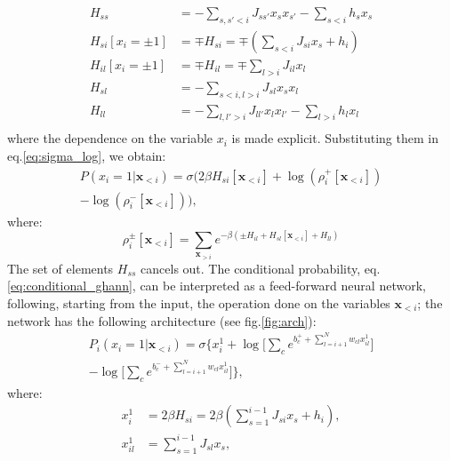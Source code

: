 \documentclass[aps,physrev,10pt,floatfix,reprint]{revtex4-2}
\begin{document}
\begin{align*}
    H_{ss} &= -\sum_{s,s'<i}J_{ss'} x_s x_{s'} - \sum_{s<i} h_s x_s \\
    H_{si}[x_i=\pm 1] & =  \mp H_{si} = \mp (\sum_{s<i} J_{si} x_s + h_i)  \\
    H_{il}[x_i = \pm 1] & = \mp H_{il} = \mp \sum_{l>i} J_{il} x_l\\
    H_{sl} &= -\sum_{s<i,l>i}J_{sl} x_s x_{l}\\
    H_{ll} &= -\sum_{l,l'>i}J_{ll'} x_l x_{l'} - \sum_{l>i} h_l x_l \\
\end{align*}
where the dependence on the variable $x_i$ is made explicit. Substituting them in eq.\ref{eq:sigma_log}, we obtain:
\begin{equation}
    \label{eq:conditional_ghann}
    \begin{split}
     P\left(x_{i}=1|\mathbf{x}_{<i}\right) = \sigma\bigg( 2 \beta H_{si}[\mathbf{x}_{<i}] +\log(\rho_i^+[\mathbf{x}_{<i}]) \\
     - \log(\rho_i^-[\mathbf{x}_{<i}])
    \bigg),   
    \end{split}
\end{equation}
where:
\begin{equation}
    \rho_i^{\pm} [\mathbf{x}_{<i}]  = \sum_{\mathbf{x}_{>i}}  e^{-\beta(\pm H_{il} + H_{sl}[\mathbf{x}_{<i}] + H_{ll})}
\label{eq:rho_ghann}
\end{equation}
The set of elements $H_{ss}$ cancels out.
The conditional probability, eq.\ref{eq:conditional_ghann}, can be interpreted as
 a feed-forward neural network, following, starting from the input, the operation done on the variables $\mathbf{x}_{<i}$; the network has the following architecture (see fig.\ref{fig:arch}):
\begin{multline}
    \label{eq:H2ANN}
        P_i\left(x_i=1 | \mathbf{x}_{<i}\right) = 
     \sigma \bigg\{ x_i^1 + \log\big[ \sum_{c} e^{b_c^+ + \sum_{l=i+1}^{N} w_{cl} x_{il}^1}\big]\\
     -\log\big[ \sum_{c} e^{b_c^- + \sum_{l=i+1}^{N} w_{cl} x_{il}^1}\big] \bigg\},
\end{multline}
where:
\begin{align}
    \label{eq:x_i_first}
    x_i^1 &= 2 \beta H_{si} =  2 \beta( \sum_{s=1}^{i-1} J_{si} x_s + h_i),\\
    \label{eq:x_il_first}
    x_{il}^1 &= \sum_{s=1}^{i-1} J_{sl} x_s,
\end{align}
\end{document}
